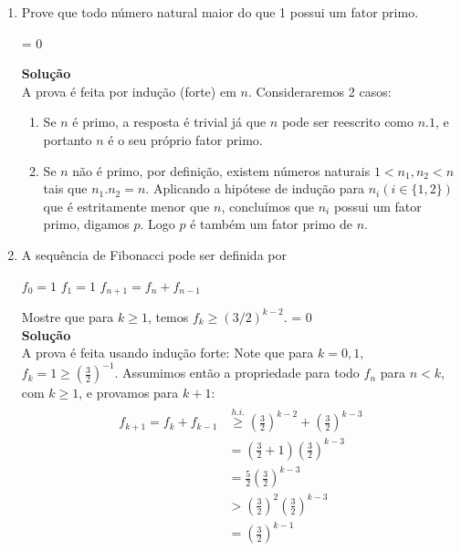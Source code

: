 \documentclass[a4paper]{article}
\newcommand{\answer}[2]{\ifnum#1= 0  {\color{blue} #2}\else \fi}
\begin{document}
\begin{enumerate}
\item Prove que todo número natural maior do que 1 possui um fator primo.
  
  \answer{0}{ 
    {\bf Solução} \\
    A prova é feita por indução (forte) em $n$. Consideraremos 2 casos:
    \begin{enumerate}
    \item  Se $n$ é primo, a resposta é trivial já que $n$ pode ser reescrito como $ n . 1 $, e portanto $n$ é o seu próprio fator primo. 
    \item Se $n$ não é primo, por definição, existem números
      naturais $1 < n_1, n_2 < n$ tais que $n_1.n_2 = n$.
      Aplicando a hipótese de indução para $n_i (i \in \{ 1,2 \} )$
      que é estritamente menor que $n$, concluímos que $n_i$
      possui um fator primo, digamos $p$. Logo $p$ é também um
      fator primo de $n$.
    \end{enumerate}
  }
  
  
\item A sequência de Fibonacci pode ser definida por
  
  $f_0 = 1$
  $f_1 = 1$
  $f_{n+1} = f_n + f_{n-1}$
  
  Mostre que para $k\geq 1$, temos $f_k \geq (3/2)^{k-2}$.
  \answer{0}{\\ 
    {\bf Solução} \\
    A prova é feita usando indução forte:
    Note que para $k=0,1$, $f_k
    = 1 \geq (\frac{3}{2})^{-1}$.
    Assumimos ent\~ao a propriedade para todo
    $f_n$ para $n<k$, com $k\geq 1$, e
    provamos para $k+1$:
    \begin{align*}
      \begin{split}
        f_{k+1} = f_k + f_{k-1} &\stackrel{h.i.}{\ge} \left(\frac{3}{2}\right)^{k-2} + \left(\frac{3}{2}\right)^{k-3}\\
        &=(\frac{3}{2} + 1) \left(\frac{3}{2}\right)^{k-3} \\
        &=\frac{5}{2} \left(\frac{3}{2}\right)^{k-3}\\
        &> \left(\frac{3}{2}\right)^{2} \left(\frac{3}{2}\right)^{k-3}\\
        &= \left(\frac{3}{2}\right)^{k-1}
      \end{split}
    \end{align*}
  }
 

\end{enumerate}
\end{document}
